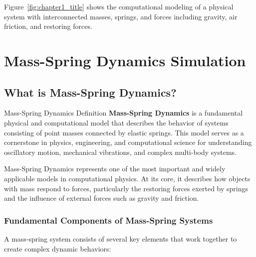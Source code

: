 Figure~\ref{fig:chapter1_title} shows the computational modeling of a physical system with interconnected masses, springs, and forces including gravity, air friction, and restoring forces.

\section{Mass-Spring Dynamics Simulation}

\subsection{What is Mass-Spring Dynamics?}

\begin{conceptcard}{Mass-Spring Dynamics Definition}
\textbf{Mass-Spring Dynamics} is a fundamental physical and computational model that describes the behavior of systems consisting of point masses connected by elastic springs. This model serves as a cornerstone in physics, engineering, and computational science for understanding oscillatory motion, mechanical vibrations, and complex multi-body systems.
\end{conceptcard}

Mass-Spring Dynamics represents one of the most important and widely applicable models in computational physics. At its core, it describes how objects with mass respond to forces, particularly the restoring forces exerted by springs and the influence of external forces such as gravity and friction.

\subsubsection{Fundamental Components of Mass-Spring Systems}

A mass-spring system consists of several key elements that work together to create complex dynamic behaviors:

